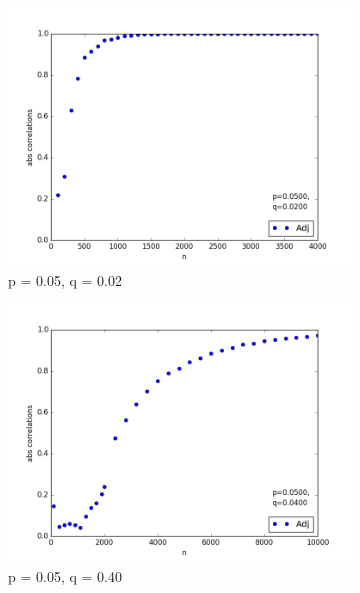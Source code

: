 \documentclass[finnish,12pt,a4paper,pdftex,sci,utf8]{aaltothesis}
\begin{document}
\begin{figure}
	\begin{subfigure}{0.3\textwidth}
		\centering
		\includegraphics[width=\textwidth]{o_pres_1.png}
		\caption{p = 0.05, q = 0.02}
		\label{fig:o_adj_1}
	\end{subfigure}
	\begin{subfigure}{0.3\textwidth}
		\centering
		\includegraphics[width=\textwidth]{o_pres_2.png}
		\caption{p = 0.05, q = 0.40}
	\end{subfigure}
	\begin{subfigure}{0.3\textwidth}
		\centering

\end{subfigure}
\end{figure}
\end{document}
